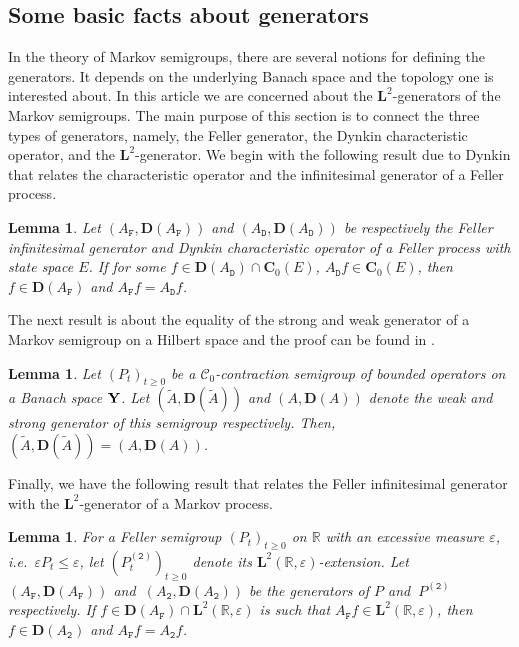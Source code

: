 \documentclass[12pt]{amsart}
\newcommand{\hlabel}{\phantomsection\label}
\numberwithin{equation}{section}
\newcommand{\bb}{\mathbb}
\newcommand{\cc}{\mathcal}
\renewcommand{\ge}{\geqslant}
\renewcommand{\geq}{\geqslant}
\renewcommand{\leq}{\leqslant}
\newcommand{\hpt}[2]{#2}
\newcommand{\ttt}{\mathtt}
\newcommand{\bmrm}[2][2]{\mathbf{#2}^{#1}}
\newcommand{\C}{\mathbf{C}}
\newcommand{\D}{\mathbf{D}}
\newtheorem{lem}[thm]{Lemma}
\theoremstyle{definition}
\theoremstyle{assump}
\theoremstyle{remark}
\begin{document}
\subsection{Some basic facts about generators}\hlabel{subsec:generator} In the theory of Markov semigroups, there are several notions for defining the generators. It depends on the underlying Banach space and the topology one is interested about. In this article we are concerned about the $\bmrm{L}$-generators of the Markov semigroups. The main purpose of this section is to connect the three types of generators, namely, the Feller generator, the Dynkin characteristic operator, and the $\bmrm{L}$-generator. We begin with the following result due to  Dynkin that relates the characteristic operator and the infinitesimal generator of a Feller process.
\begin{lem}\cite[Theorem 5.5, Chapter V.3]{ebdynkin} \hlabel{lem:Dynkin}
Let $(A_\ttt{F},\D(A_\ttt{F}))$ and $(A_\ttt{D},\D(A_\ttt{D}))$ be respectively the Feller infinitesimal generator and Dynkin characteristic operator of a Feller process with state space $E$. If for some $\hpt{R18}{f\in\D(A_\ttt{D})\cap \C_0(E)}$, $A_\ttt{D}f\in \C_0(E)$, then $f\in\D(A_\ttt{F})$ and $A_\ttt{F}f=A_\ttt{D}f$.
\end{lem}
The next result is about the equality of the strong and weak generator of a Markov semigroup on a Hilbert space and the proof can be found in \cite{Pazy}.
\begin{lem}\cite[Theorem 1.3]{Pazy}\hlabel{lem:weak=strong}
Let $(P_t)_{t\geq0}$ be a $\cc{C}_0$-contraction semigroup %
of bounded operators on a Banach space ${\bf{Y}}$. Let $(\tilde{A},\D(\tilde{A}))$ and $(A,\D(A))$ denote the weak and strong generator of this semigroup respectively. Then, $(\tilde{A},\D(\tilde{A}))=(A,\D(A))$.
\end{lem}
Finally, we have the following result that relates the Feller infinitesimal generator with the $\mathbf L^2$-generator of a Markov process.
\begin{lem}\hlabel{lem:feller=L2}
For a Feller semigroup $(P_t)_{t\ge 0}$ \hpt{R19}{on $\bb{R}$} with an excessive measure  $\varepsilon$, i.e.~$\varepsilon P_t \leq \varepsilon $, let $(P^{(\ttt{2})}_t)_{t\ge 0}$ denote its $\bmrm{L}(\bb{R},\varepsilon)$-extension. Let $(A_\ttt{F},\D(A_\ttt{F}))$ and $\ (A_\ttt{2},\D(A_\ttt{2}))$ be the generators of $P$ and $ \ P^{(\ttt{2})}$ respectively. If $f\in\D(A_\ttt{F})\cap\bmrm{L}(\bb{R},\varepsilon)$ is such that $A_\ttt{F}f\in \bmrm{L}(\bb{R},\varepsilon)$, then $f\in\D(A_\ttt{2})$ and $A_\ttt{F}f=A_\ttt{2}f$.
\end{lem}
\end{document}
